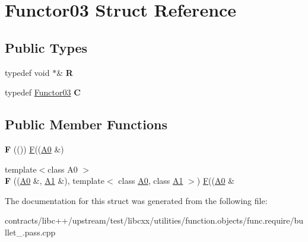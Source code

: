 \hypertarget{struct_functor03}{}\section{Functor03 Struct Reference}
\label{struct_functor03}
\subsection*{Public Types}
\begin{DoxyCompactItemize}
\item 
\mbox{\label{struct_functor03_abdb8eea07d19579a67c1e6df5314c903}} 
typedef void $\ast$\& {\bfseries R}
\item 
\mbox{\label{struct_functor03_a1bde6d9d5fe18d57117bd52a385384b6}} 
typedef \mbox{\hyperlink{struct_functor03}{Functor03}} {\bfseries C}
\end{DoxyCompactItemize}
\subsection*{Public Member Functions}
\begin{DoxyCompactItemize}
\item 
\mbox{\label{struct_functor03_aff0b0e4e79e5799d6ea6242914d3b37b}} 
{\bfseries F} (()) \mbox{\hyperlink{struct_f}{F}}((\mbox{\hyperlink{struct_a0}{A0}} \&)
\item 
\mbox{\label{struct_functor03_a905ddf839014bfa02821fa6b2fa8c9cd}} 
{\footnotesize template$<$class A0 $>$ }\\{\bfseries F} ((\mbox{\hyperlink{struct_a0}{A0}} \&, \mbox{\hyperlink{struct_a1}{A1}} \&), template$<$ class \mbox{\hyperlink{struct_a0}{A0}}, class \mbox{\hyperlink{struct_a1}{A1}} $>$) \mbox{\hyperlink{struct_f}{F}}((\mbox{\hyperlink{struct_a0}{A0}} \&
\end{DoxyCompactItemize}


The documentation for this struct was generated from the following file\+:\begin{DoxyCompactItemize}
\item 
contracts/libc++/upstream/test/libcxx/utilities/function.\+objects/func.\+require/bullet\+\_.\+pass.\+cpp\end{DoxyCompactItemize}
